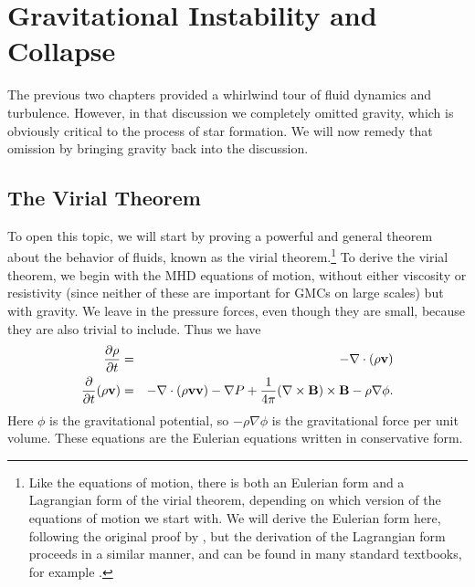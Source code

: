 \chapter{Gravitational Instability and Collapse}
\label{ch:collapse}


The previous two chapters provided a whirlwind tour of fluid dynamics and turbulence. However, in that discussion we completely omitted gravity, which is obviously critical to the process of star formation. We will now remedy that omission by bringing gravity back into the discussion.

\section{The Virial Theorem}

To open this topic, we will start by proving a powerful and general theorem about the behavior of fluids, known as the virial theorem.\footnote{Like the equations of motion, there is both an Eulerian form and a Lagrangian form of the virial theorem, depending on which version of the equations of motion we start with. We will derive the Eulerian form here, following the original proof by \citet{mckee92a}, but the derivation of the Lagrangian form proceeds in a similar manner, and can be found in many standard textbooks, for example \citet{shu92a}.} To derive the virial theorem, we begin with the MHD equations of motion, without either viscosity or resistivity (since neither of these are important for GMCs on large scales) but with gravity. We leave in the pressure forces, even though they are small, because they are also trivial to include. Thus we have
\begin{eqnarray}
\frac{\partial\rho}{\partial t} & = & -\nabla \cdot (\rho \mathbf{v}) \\
\frac{\partial}{\partial t}(\rho \mathbf{v}) & = & -\nabla\cdot(\rho\mathbf{v}\mathbf{v}) -\nabla P + \frac{1}{4\pi} (\nabla\times\mathbf{B})\times\mathbf{B} - \rho \nabla \phi.
\end{eqnarray}
Here $\phi$ is the gravitational potential, so $-\rho \nabla \phi$ is the gravitational force per unit volume. These equations are the Eulerian equations written in conservative form.

